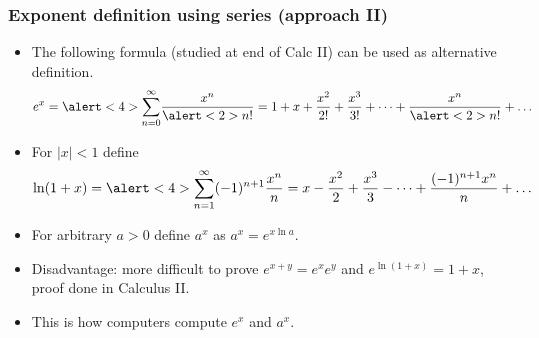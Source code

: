 \begin{frame}
\frametitle{Exponent definition using series (approach II)}
\begin{itemize}
\item<1-> The following formula (studied at end of Calc II) can be used as alternative definition.
\[
e^{x}=\alert<4>{\sum_{n=0}^{\infty}} \frac{x^n}{\alert<2>{n!}}= 1+ x+\frac{x^2}{2!}+\frac{x^3}{3!}+\dots + \frac{x^{n}}{\alert<2>{n!}}+\dots
\]
\item<3-> For $|x|<1$ define 
\[
\ln (1+x)=\alert<4>{\sum_{n=1}^{\infty}} (-1)^{n+1}\frac{x^n}{n}=  x-\frac{x^2}{2}+\frac{x^3}{3}-\dots + \frac{(-1)^{n+1}x^{n}}{n}+\dots
\]
\item<5-> For arbitrary $a>0$ define $a^x$ as $a^x=e^{x\ln a}$. 
\item<6-> Disadvantage: more difficult to prove $e^{x+y}=e^{x}e^y$ and $e^{\ln(1+x)}=1+x$, proof done in Calculus II.
\item<7-> This is how computers compute $e^x$ and $a^x$.
\end{itemize}
\end{frame}

